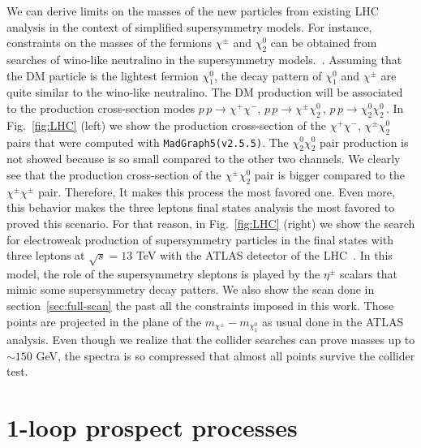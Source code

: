 \documentclass[12pt,letterpaper]{article}
\begin{document}
%
We can derive limits on the masses of the new particles from existing LHC analysis in the context of simplified supersymmetry models.
For instance, constraints on the masses of the fermions $\chi^{\pm}$ and $\chi_2^0$ can be obtained from searches of wino-like neutralino in the supersymmetry models.~\cite{Aaboud:2018jiw}.
Assuming that the DM particle is the lightest fermion $\chi_1^0$, the decay pattern of $\chi_1^0$ and $\chi^{\pm}$ are quite similar to the wino-like neutralino. 
The DM production will be associated to the production cross-section modes $p\,p\to\chi^+\chi^-$, $p\,p\to\chi^{\pm}\chi_2^0\,$, $p\,p\to\chi_2^0\chi_2^0\,$. 
In Fig.~\ref{fig:LHC} (left) we show the production cross-section of the $\chi^+\chi^-$, $\chi^{\pm}\chi_2^0\,$ pairs that were computed with \texttt{MadGraph5(v2.5.5)}\cite{Alwall:2014hca}.
The $\chi_2^0\chi_2^0$ pair production is not showed because is so small compared to the other two channels. 
We clearly see that the production cross-section of the $\chi^{\pm}\chi^0_2$ pair is bigger compared to the $\chi^{\pm}\chi^{\pm}$ pair. Therefore, It makes this process the most favored one. Even more, this behavior makes the three leptons final states analysis the most favored to proved this scenario. 
For that reason, in Fig.~\ref{fig:LHC} (right) we show the search for electroweak production of supersymmetry particles in the final states with three leptons at $\sqrt{s}=13$ TeV with the ATLAS detector of the LHC~\cite{Aaboud:2018jiw}. 
In this model, the role of the supersymmetry sleptons is played by the $\eta^{\pm}$ scalars that mimic some supersymmetry decay patters.
We also show the scan done in section~\ref{sec:full-scan} the past all the constraints imposed in this work. Those points are projected in the plane of the $m_{\chi^{\pm}}-m_{\chi_1^0}$ as usual done in the ATLAS analysis. Even though we realize that the collider searches can prove masses up to $\sim 150$ GeV, the spectra is so compressed that almost all points survive the collider test.
 







\section{1-loop prospect processes}
\label{sec:1-loop-processes}
\end{document}
